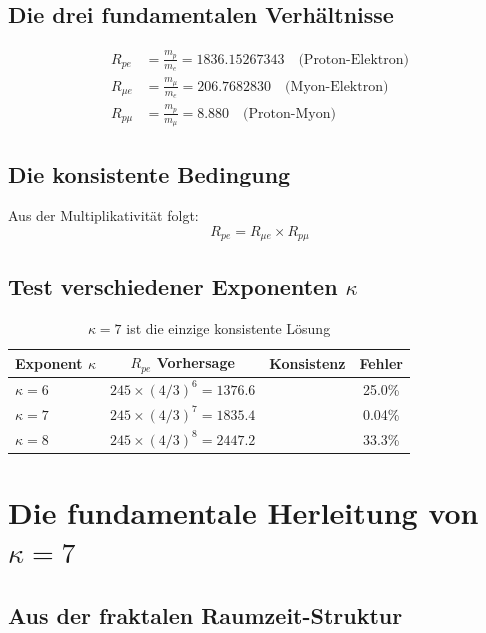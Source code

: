 	\subsection{Die drei fundamentalen Verhältnisse}
	
	\begin{align}
		R_{pe} &= \frac{m_p}{m_e} = 1836.15267343 \quad \text{(Proton-Elektron)} \\
		R_{\mu e} &= \frac{m_{\mu}}{m_e} = 206.7682830 \quad \text{(Myon-Elektron)} \\
		R_{p\mu} &= \frac{m_p}{m_{\mu}} = 8.880 \quad \text{(Proton-Myon)}
	\end{align}
	
	\subsection{Die konsistente Bedingung}
	
	Aus der Multiplikativität folgt:
	\begin{equation}
		R_{pe} = R_{\mu e} \times R_{p\mu}
	\end{equation}
	
	\subsection{Test verschiedener Exponenten $\kappa$}
	
	\begin{table}[htbp]
		\centering
		\begin{tabular}{lccc}
			\toprule
			\textbf{Exponent $\kappa$} & \textbf{$R_{pe}$ Vorhersage} & \textbf{Konsistenz} & \textbf{Fehler} \\
			\midrule
			$\kappa = 6$ & $245 \times (4/3)^6 = 1376.6$ & \texttimes & 25.0\% \\
			$\kappa = 7$ & $245 \times (4/3)^7 = 1835.4$ & \checkmark & 0.04\% \\
			$\kappa = 8$ & $245 \times (4/3)^8 = 2447.2$ & \texttimes & 33.3\% \\
			\bottomrule
		\end{tabular}
		\caption{$\kappa = 7$ ist die einzige konsistente Lösung}
	\end{table}
	
	\section{Die fundamentale Herleitung von $\kappa = 7$}
	
	\subsection{Aus der fraktalen Raumzeit-Struktur}
	
